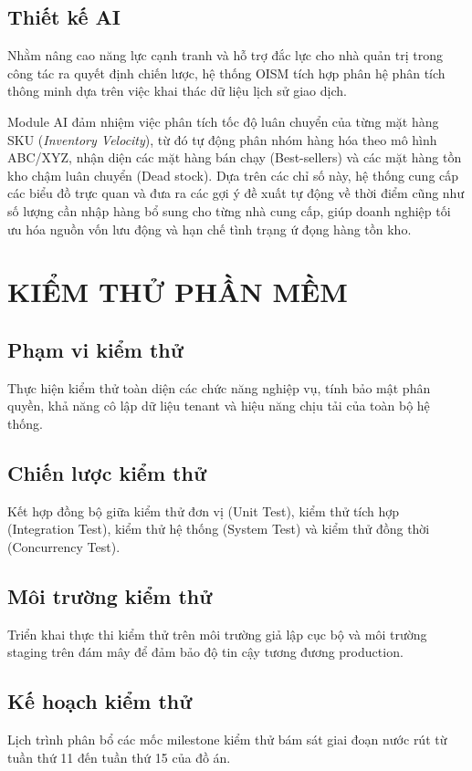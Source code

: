 \documentclass[12pt,a4paper]{report}
\begin{document}
	\section{Thiết kế AI}
	Nhằm nâng cao năng lực cạnh tranh và hỗ trợ đắc lực cho nhà quản trị trong công tác ra quyết định chiến lược, hệ thống OISM tích hợp phân hệ phân tích thông minh dựa trên việc khai thác dữ liệu lịch sử giao dịch.
	\par
	Module AI đảm nhiệm việc phân tích tốc độ luân chuyển của từng mặt hàng SKU (\textit{Inventory Velocity}), từ đó tự động phân nhóm hàng hóa theo mô hình ABC/XYZ, nhận diện các mặt hàng bán chạy (Best-sellers) và các mặt hàng tồn kho chậm luân chuyển (Dead stock). Dựa trên các chỉ số này, hệ thống cung cấp các biểu đồ trực quan và đưa ra các gợi ý đề xuất tự động về thời điểm cũng như số lượng cần nhập hàng bổ sung cho từng nhà cung cấp, giúp doanh nghiệp tối ưu hóa nguồn vốn lưu động và hạn chế tình trạng ứ đọng hàng tồn kho.
	
	\chapter{KIỂM THỬ PHẦN MỀM}
	\section{Phạm vi kiểm thử}
	Thực hiện kiểm thử toàn diện các chức năng nghiệp vụ, tính bảo mật phân quyền, khả năng cô lập dữ liệu tenant và hiệu năng chịu tải của toàn bộ hệ thống.
	
	\section{Chiến lược kiểm thử}
	Kết hợp đồng bộ giữa kiểm thử đơn vị (Unit Test), kiểm thử tích hợp (Integration Test), kiểm thử hệ thống (System Test) và kiểm thử đồng thời (Concurrency Test).
	
	\section{Môi trường kiểm thử}
	Triển khai thực thi kiểm thử trên môi trường giả lập cục bộ và môi trường staging trên đám mây để đảm bảo độ tin cậy tương đương production.
	
	\section{Kế hoạch kiểm thử}
	Lịch trình phân bổ các mốc milestone kiểm thử bám sát giai đoạn nước rút từ tuần thứ 11 đến tuần thứ 15 của đồ án.
	
\end{document}
